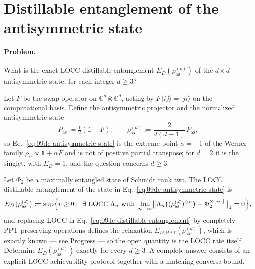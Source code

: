 \section{Distillable entanglement of the antisymmetric state}
\label{sec:op_09dc815c8a194fb7}

\paragraph{Problem.}
What is the exact LOCC distillable entanglement
$E_D(\rho_{\mathrm{as}}^{(d)})$ of the $d\times d$ antisymmetric state, for
each integer $d\ge3$?

Let $F$ be the swap operator on $\mathbb C^d\otimes\mathbb C^d$, acting by
$F\,|ij\rangle=|ji\rangle$ on the computational basis.  Define the
antisymmetric projector and the normalized antisymmetric state
\begin{equation}
  P_{\mathrm{as}}:=\tfrac12(\mathbb 1-F),
  \qquad
  \rho_{\mathrm{as}}^{(d)}:=\frac{2}{d(d-1)}\,P_{\mathrm{as}},
  \label{eq:09dc-antisymmetric-state}
\end{equation}
so Eq.~\eqref{eq:09dc-antisymmetric-state} is the extreme point $\alpha=-1$
of the Werner family $\rho_\alpha\propto\mathbb 1+\alpha F$ and is not of
positive partial transpose; for $d=2$ it is the singlet, with $E_D=1$, and
the question concerns $d\ge3$.

Let $\Phi_2$ be a maximally entangled state of Schmidt rank two.  The LOCC
distillable entanglement of the state in
Eq.~\eqref{eq:09dc-antisymmetric-state} is
\begin{equation}
  E_D\bigl(\rho_{\mathrm{as}}^{(d)}\bigr):=\sup\Bigl\{r\ge0:\ \exists\
  \mathrm{LOCC}\ \Lambda_n\ \mathrm{with}\
  \lim_{n\to\infty}\bigl\|\Lambda_n\bigl((\rho_{\mathrm{as}}^{(d)})^{\otimes n}\bigr)
  -\Phi_2^{\otimes\lfloor rn\rfloor}\bigr\|_1=0\Bigr\},
  \label{eq:09dc-distillable-entanglement}
\end{equation}
and replacing LOCC in Eq.~\eqref{eq:09dc-distillable-entanglement} by
completely PPT-preserving operations defines the relaxation
$E_{D,\mathrm{PPT}}(\rho_{\mathrm{as}}^{(d)})$, which is exactly known ---
see Progress --- so the open quantity is the LOCC rate itself.  Determine
$E_D(\rho_{\mathrm{as}}^{(d)})$ exactly for every $d\ge3$.  A complete answer
consists of an explicit LOCC achievability protocol together with a
matching converse bound.

